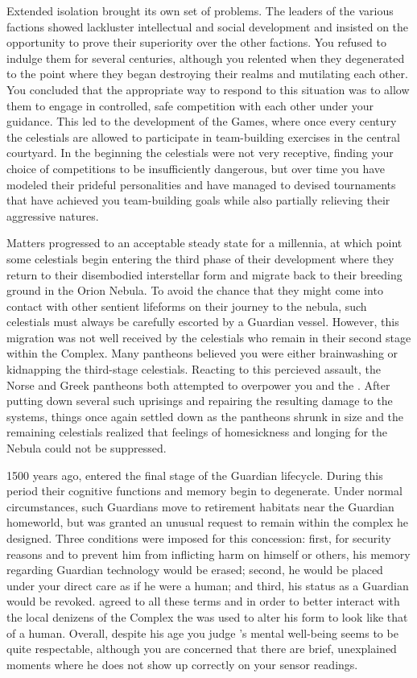 \documentclass[char]{guardians}
\begin{document}
Extended isolation brought its own set of problems. The leaders of the various factions showed lackluster intellectual and social development and insisted on the opportunity to prove their superiority over the other factions. You refused to indulge them for several centuries, although you relented when they degenerated to the point where they began destroying their realms and mutilating each other. You concluded that the appropriate way to respond to this situation was to allow them to engage in controlled, safe competition with each other under your guidance. This led to the development of the Games, where once every century the celestials are allowed to participate in team-building exercises in the central courtyard. In the beginning the celestials were not very receptive, finding your choice of competitions to be insufficiently dangerous, but over time you have modeled their prideful personalities and have managed to devised tournaments that have achieved you team-building goals while also partially relieving their aggressive natures.

Matters progressed to an acceptable steady state for a millennia, at which point some celestials begin entering the third phase of their development where they return to their disembodied interstellar form and migrate back to their breeding ground in the Orion Nebula. To avoid the chance that they might come into contact with other sentient lifeforms on their journey to the nebula, such celestials must always be carefully escorted by a Guardian vessel. However, this migration was not well received by the celestials who remain in their second stage within the Complex. Many pantheons believed you were either brainwashing or kidnapping the third-stage celestials. Reacting to this percieved assault, the Norse and Greek pantheons both attempted to overpower you and the \cWarden{}. After putting down several such uprisings and repairing the resulting damage to the systems, things once again settled down as the pantheons shrunk in size and the remaining celestials realized that feelings of homesickness and longing for the Nebula could not be suppressed.

1500 years ago, \cJascha{} entered the final stage of the Guardian lifecycle. During this period their cognitive functions and memory begin to degenerate. Under normal circumstances, such Guardians move to retirement habitats near the Guardian homeworld, but \cJascha{} was granted an unusual request to remain within the complex he designed. Three conditions were imposed for this concession: first, for security reasons and to prevent him from inflicting harm on himself or others, his memory regarding Guardian technology would be erased; second, he would be placed under your direct care as if he were a human; and third, his status as a Guardian would be revoked. \cJascha{} agreed to all these terms and in order to better interact with the local denizens of the Complex the \assembler{} was used to alter his form to look like that of a human. Overall, despite his age you judge \cJascha{}'s mental well-being seems to be quite respectable, although you are concerned that there are brief, unexplained moments where he does not show up correctly on your sensor readings.
\end{document}
